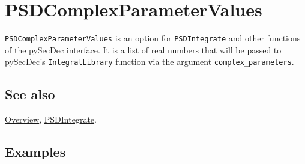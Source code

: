 \documentclass[../FeynHelpersManual.tex]{subfiles}
\begin{document}
\hypertarget{psdcomplexparametervalues}{
\section{PSDComplexParameterValues}\label{psdcomplexparametervalues}}

\texttt{PSDComplexParameterValues} is an option for
\texttt{PSDIntegrate} and other functions of the pySecDec interface. It
is a list of real numbers that will be passed to pySecDec's
\texttt{IntegralLibrary} function via the argument
\texttt{complex_parameters}.

\subsection{See also}

\hyperlink{toc}{Overview}, \hyperlink{psdintegrate}{PSDIntegrate}.

\subsection{Examples}
\end{document}
